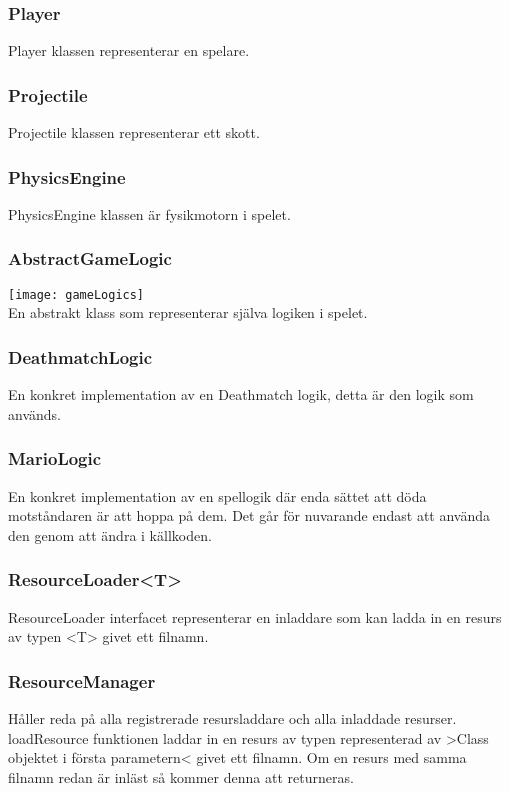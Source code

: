 \subsubsection{Player}
Player klassen representerar en spelare.\\
\subsubsection{Projectile}
Projectile klassen representerar ett skott.\\
\subsubsection{PhysicsEngine}
PhysicsEngine klassen är fysikmotorn i spelet.\\
\subsubsection{AbstractGameLogic}
\texttt{[image: gameLogics]}\\
En abstrakt klass som representerar själva logiken i spelet.\\
\subsubsection{DeathmatchLogic}
En konkret implementation av en Deathmatch logik, detta är den logik som används.\\
\subsubsection{MarioLogic}
En konkret implementation av en spellogik där enda sättet att döda motståndaren är att hoppa på dem. Det går för nuvarande endast att använda den genom att ändra i källkoden.\\
\subsubsection{ResourceLoader<T>}
ResourceLoader interfacet representerar en inladdare som kan ladda in en resurs av typen <T> givet ett filnamn.\\
\pagebreak
\subsubsection{ResourceManager}
Håller reda på alla registrerade resursladdare och alla inladdade resurser.\\
loadResource funktionen laddar in en resurs av typen representerad av >Class objektet i första parametern< givet ett filnamn. Om en resurs med samma filnamn redan är inläst så kommer denna att returneras.\\
